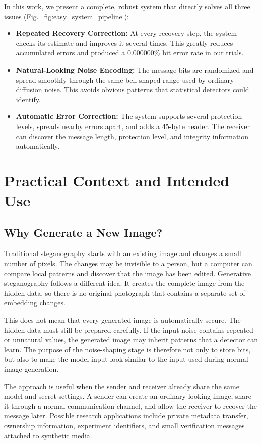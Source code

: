 \documentclass[conference]{IEEEtran}
\begin{document}
In this work, we present a complete, robust system that directly solves all three issues (Fig.~\ref{fig:easy_system_pipeline}):
\begin{itemize}
    \item \textbf{Repeated Recovery Correction:} At every recovery step, the system checks its estimate and improves it several times. This greatly reduces accumulated errors and produced a 0.000000\% bit error rate in our trials.
    \item \textbf{Natural-Looking Noise Encoding:} The message bits are randomized and spread smoothly through the same bell-shaped range used by ordinary diffusion noise. This avoids obvious patterns that statistical detectors could identify.
    \item \textbf{Automatic Error Correction:} The system supports several protection levels, spreads nearby errors apart, and adds a 45-byte header. The receiver can discover the message length, protection level, and integrity information automatically.
\end{itemize}

\section{Practical Context and Intended Use}

\subsection{Why Generate a New Image?}
Traditional steganography starts with an existing image and changes a small number of pixels. The changes may be invisible to a person, but a computer can compare local patterns and discover that the image has been edited. Generative steganography follows a different idea. It creates the complete image from the hidden data, so there is no original photograph that contains a separate set of embedding changes.

This does not mean that every generated image is automatically secure. The hidden data must still be prepared carefully. If the input noise contains repeated or unnatural values, the generated image may inherit patterns that a detector can learn. The purpose of the noise-shaping stage is therefore not only to store bits, but also to make the model input look similar to the input used during normal image generation.

The approach is useful when the sender and receiver already share the same model and secret settings. A sender can create an ordinary-looking image, share it through a normal communication channel, and allow the receiver to recover the message later. Possible research applications include private metadata transfer, ownership information, experiment identifiers, and small verification messages attached to synthetic media.
\end{document}
